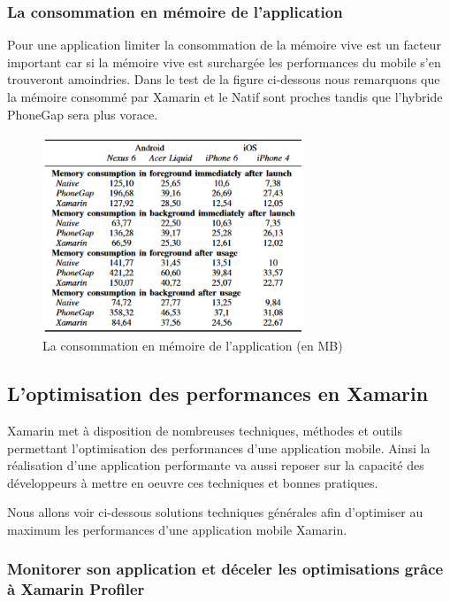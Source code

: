 \documentclass[11]{article}
\begin{document}
 
\subsubsection{La consommation en mémoire de l’application}
   
Pour une application limiter la consommation de la mémoire vive est un facteur important car si la mémoire vive est surchargée les performances du mobile s’en trouveront amoindries. Dans le test de la figure ci-dessous nous remarquons que la mémoire consommé par Xamarin et le Natif sont proches tandis que l’hybride PhoneGap sera plus vorace.


 \begin{figure}[h]
    \centering
    \includegraphics[width=0.7\textwidth]{a5}
    \caption{La consommation en mémoire de l’application (en MB)}
    \label{bat}
\end{figure}
 
 


\subsection{L’optimisation des performances en Xamarin}
 
Xamarin met à disposition de nombreuses techniques, méthodes et outils permettant l’optimisation des performances d’une application mobile. Ainsi la réalisation d’une application performante va aussi reposer sur la capacité des développeurs à mettre en oeuvre ces techniques et bonnes pratiques. 
  
   \vspace{0.5cm}
   
Nous allons voir ci-dessous solutions techniques générales afin d’optimiser au maximum les performances d’une application mobile Xamarin.


 \subsubsection{Monitorer son application et déceler les optimisations grâce à Xamarin Profiler}
 
\end{document}
